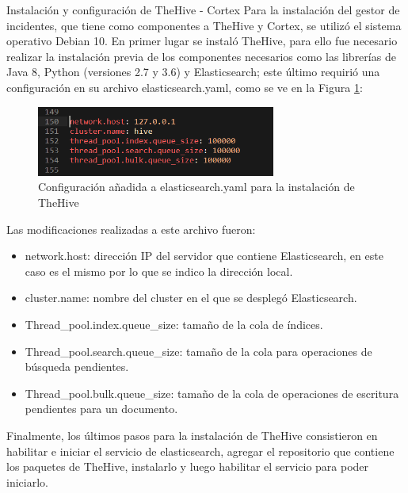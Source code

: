         \begin{section}{Instalación y configuración de TheHive - Cortex}
        Para la instalación del gestor de incidentes, que tiene como componentes a  TheHive y Cortex, se utilizó  el sistema operativo Debian 10. En primer lugar se instaló TheHive, para ello fue necesario realizar la instalación previa de los componentes necesarios como las librerías de Java 8, Python (versiones 2.7 y 3.6) y Elasticsearch; este último requirió una configuración en su archivo elasticsearch.yaml, como se ve en la Figura \ref{fig:figura_39_thehive_conf}:
        
        \begin{figure}[H]
            \centering
            \includegraphics[width=0.7\textwidth]{./iteracion_1_imagenes/figura_39_thehive_conf_elastic.png}
            \caption{Configuración añadida a elasticsearch.yaml para la instalación de TheHive}
            \label{fig:figura_39_thehive_conf}
        \end{figure}
        Las modificaciones realizadas a este archivo fueron:
        \begin{itemize}
            \item network.host: dirección IP del servidor que contiene Elasticsearch, en este caso es el mismo por lo que se indico la dirección local.
            \item cluster.name: nombre del cluster en el que se desplegó Elasticsearch.
            \item Thread\_pool.index.queue\_size: tamaño de la cola de índices.
            \item Thread\_pool.search.queue\_size: tamaño de la cola para operaciones de búsqueda pendientes.
            \item Thread\_pool.bulk.queue\_size: tamaño de la cola de operaciones de escritura pendientes para un documento.
        \end{itemize}
        \par
        Finalmente, los últimos pasos para la instalación de TheHive consistieron en habilitar e iniciar el servicio de elasticsearch, agregar el repositorio que contiene los paquetes de TheHive, instalarlo y luego habilitar el servicio para poder iniciarlo. \par

\end{section}
